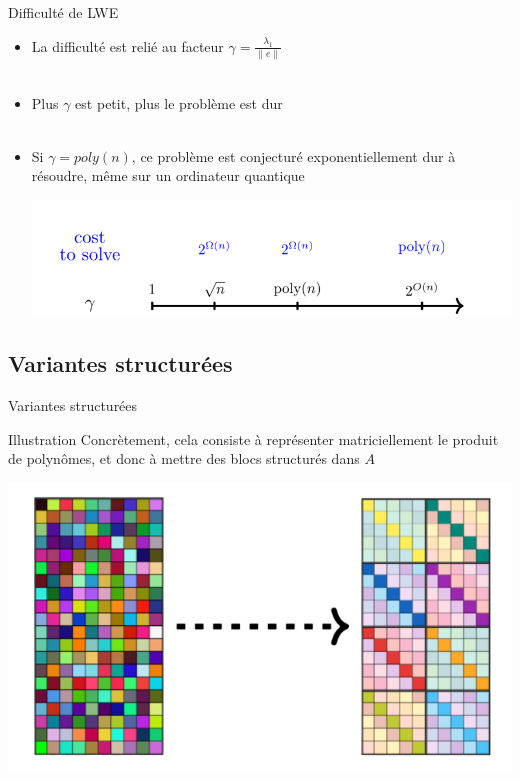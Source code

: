 \documentclass[10 pt, a4paper]{beamer}
\begin{document}
\begin{frame}{Difficulté de LWE}
\begin{itemize}
\item<1->[•]La difficulté est relié au facteur $\gamma = \frac{\lambda_1}{\|e\|}$ \\ ~ \\
\item<2->[•] Plus $\gamma$ est petit, plus le problème est dur \\ ~ \\
\item<3->[•] Si $\gamma = poly(n)$, ce problème est conjecturé exponentiellement dur à résoudre, même sur un ordinateur quantique
\begin{center}
\includegraphics[scale=0.30]{gamma_hard.png}
\end{center}
\end{itemize}
\end{frame}

\subsection{Variantes structurées}
\begin{frame}{Variantes structurées}
\end{frame}


\begin{frame}{Illustration}
Concrètement, cela consiste à représenter matriciellement le produit de polynômes, et donc à mettre des blocs structurés dans $A$
\begin{center}
\includegraphics[scale=0.30]{plwe_struct.png}
\end{center}
\end{frame}
\end{document}
